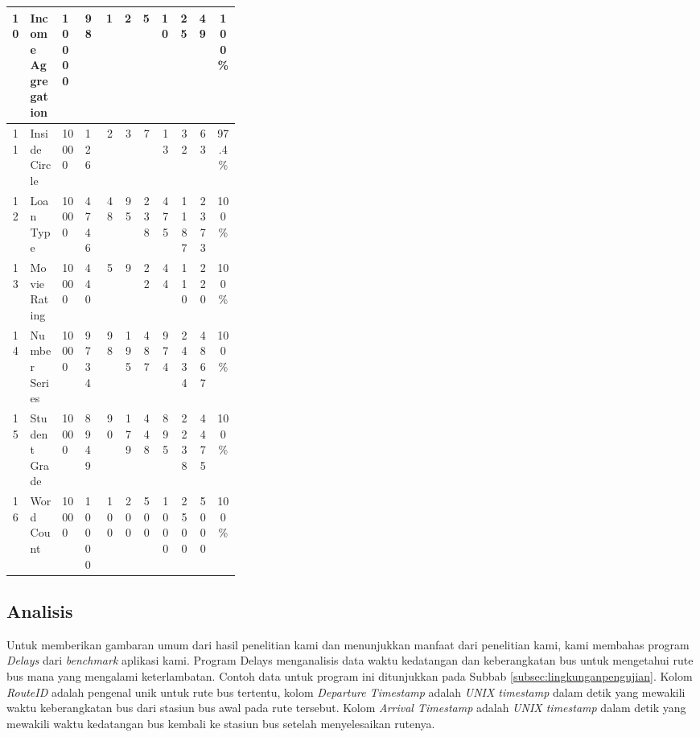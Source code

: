 \begin{longtable}{|c|p{0.14\linewidth}|p{0.1\linewidth}|p{0.09\linewidth}|r|r|r|r|r|r|c|}
      \hline
      10 & \raggedright{Income Aggregation} & 10000 & 98 & 1 & 2 & 5 & 10 & 25 & 49 & 100\% \\
      \hline
      11 & Inside Circle & 10000 & 126 & 2 & 3 & 7 & 13 & 32 & 63 & 97.4\% \\
      \hline
      12 & Loan Type & 10000 & 4746 & 48 & 95 & 238 & 475 & 1187 & 2373 & 100\% \\
      \hline
      13 & \raggedright{Movie Rating} & 10000 & 440 & 5 & 9 & 22 & 44 & 110 & 220 & 100\% \\
      \hline
      14 & \raggedright{Number Series} & 10000 & 9734 & 98 & 195 & 487 & 974 & 2434 & 4867 & 100\% \\
      \hline
      15 & \raggedright{Student Grade} & 10000 & 8949 & 90 & 179 & 448 & 895 & 2238 & 4475 & 100\% \\
      \hline
      16 & \raggedright{Word Count} & 10000 & 10000 & 100 & 200 & 500 & 1000 & 2500 & 5000 & 100\% \\
      \hline         
\end{longtable}



\subsection{Analisis}
\label{subsec:analisis}

Untuk memberikan gambaran umum dari hasil penelitian kami 
dan menunjukkan manfaat dari penelitian kami, kami membahas 
program \emph{Delays} dari \emph{benchmark} aplikasi kami. 
Program Delays menganalisis data waktu kedatangan dan 
keberangkatan bus untuk mengetahui rute bus mana yang 
mengalami keterlambatan. Contoh data untuk program ini 
ditunjukkan pada Subbab \ref{subsec:lingkunganpengujian}.
Kolom \emph{RouteID} adalah pengenal unik untuk rute 
bus tertentu, kolom \emph{Departure Timestamp} adalah 
\emph{UNIX timestamp} dalam detik yang mewakili waktu 
keberangkatan bus dari stasiun bus awal pada rute tersebut. 
Kolom \emph{Arrival Timestamp} adalah \emph{UNIX timestamp} 
dalam detik yang mewakili waktu kedatangan bus kembali 
ke stasiun bus setelah menyelesaikan rutenya.

